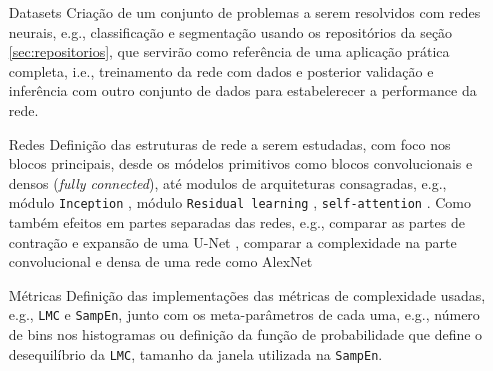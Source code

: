 \documentclass[
	12pt,				%
	openany,oneside,
	a4paper,			%
	english,			%
	brazil,				%
	]{abntex2}
\begin{document}
\begin{enumerate}
\item[Datasets] Criação de um conjunto de problemas a serem resolvidos com redes neurais, e.g., classificação e segmentação usando os repositórios da seção \ref{sec:repositorios}, que servirão como referência de uma aplicação prática completa, i.e., treinamento da rede com dados e posterior validação e inferência com outro conjunto de dados para estabelerecer a performance da rede.
\item[Redes] Definição das estruturas de rede a serem estudadas, com foco nos blocos principais, desde os módelos primitivos como blocos convolucionais e densos (\textit{fully connected}), até modulos de arquiteturas consagradas, e.g., módulo \texttt{Inception} \cite{c11}, módulo \texttt{Residual learning} \cite{c12}, \texttt{self-attention} \cite{Vaswani2017}. Como também efeitos em partes separadas das redes, e.g., comparar as partes de contração e expansão de uma U-Net \cite{c9}, comparar a complexidade na parte convolucional e densa de uma rede como AlexNet \cite{c4}
\item[Métricas] Definição das implementações das métricas de complexidade usadas, e.g., \texttt{LMC} e \texttt{SampEn}, junto com os meta-parâmetros de cada uma, e.g., número de bins nos histogramas ou definição da função de probabilidade que define o desequilíbrio da \texttt{LMC}, tamanho da janela utilizada na \texttt{SampEn}.
\end{enumerate}
\end{document}
